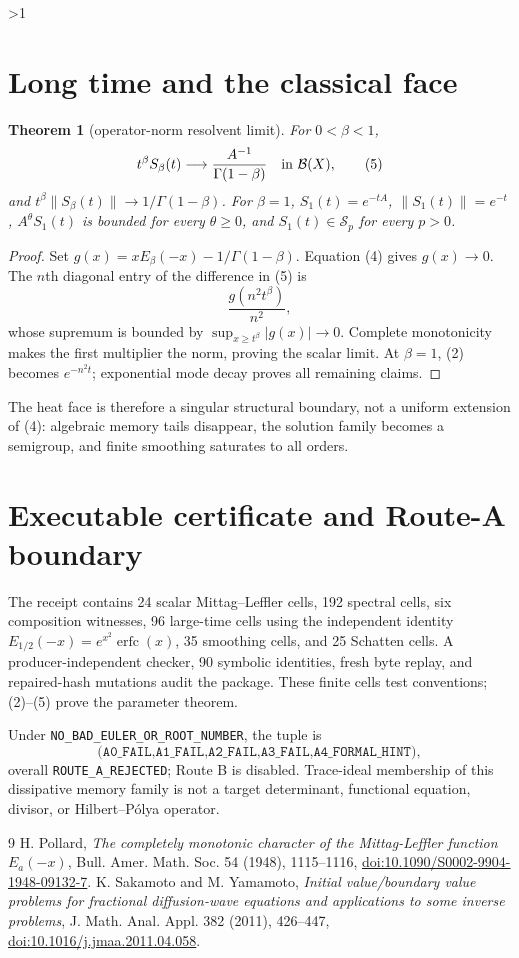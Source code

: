 \documentclass[10pt]{article}
\providecommand{\CRevisionRound}{2}
\newtheorem{theorem}{Theorem}
\begin{document}
\ifnum\CRevisionRound>1
\section{Long time and the classical face}
\begin{theorem}[operator-norm resolvent limit]
For $0<\beta<1$,
\begin{equation}
 t^\beta S_\beta(t)\longrightarrow
 \frac{A^{-1}}{\Gamma(1-\beta)}\quad\hbox{in }\mathcal B(X),          \tag{5}
\end{equation}
and
$t^\beta\lVert S_\beta(t)\rVert\to1/\Gamma(1-\beta)$.
For $\beta=1$, $S_1(t)=e^{-tA}$, $\lVert S_1(t)\rVert=e^{-t}$,
$A^\theta S_1(t)$ is bounded for every $\theta\geq0$, and
$S_1(t)\in\mathcal S_p$ for every $p>0$.
\end{theorem}
\begin{proof}
Set $g(x)=xE_\beta(-x)-1/\Gamma(1-\beta)$.  Equation (4) gives
$g(x)\to0$.  The $n$th diagonal entry of the difference in (5) is
\[
 \frac{g(n^2t^\beta)}{n^2},
\]
whose supremum is bounded by $\sup_{x\geq t^\beta}|g(x)|\to0$.
Complete monotonicity makes the first multiplier the norm, proving the scalar
limit.  At $\beta=1$, (2) becomes $e^{-n^2t}$; exponential mode decay proves
all remaining claims.
\end{proof}

The heat face is therefore a singular structural boundary, not a uniform
extension of (4): algebraic memory tails disappear, the solution family
becomes a semigroup, and finite smoothing saturates to all orders.

\section{Executable certificate and Route-A boundary}
The receipt contains 24 scalar Mittag--Leffler cells, 192 spectral cells, six
composition witnesses, 96 large-time cells using the independent identity
$E_{1/2}(-x)=e^{x^2}\operatorname{erfc}(x)$, 35 smoothing cells, and 25
Schatten cells.  A producer-independent checker, 90 symbolic identities,
fresh byte replay, and repaired-hash mutations audit the package.  These
finite cells test conventions; (2)--(5) prove the parameter theorem.

Under \texttt{NO\_BAD\_EULER\_OR\_ROOT\_NUMBER}, the tuple is
\[
\texttt{(A0\_FAIL,A1\_FAIL,A2\_FAIL,A3\_FAIL,A4\_FORMAL\_HINT)},
\]
overall \texttt{ROUTE\_A\_REJECTED}; Route B is disabled.  Trace-ideal
membership of this dissipative memory family is not a target determinant,
functional equation, divisor, or Hilbert--P\'olya operator.
\fi

\begin{thebibliography}{9}
 H. Pollard,
\emph{The completely monotonic character of the Mittag-Leffler function
$E_a(-x)$}, Bull. Amer. Math. Soc. 54 (1948), 1115--1116,
\href{https://doi.org/10.1090/S0002-9904-1948-09132-7}{doi:10.1090/S0002-9904-1948-09132-7}.
 K. Sakamoto and M. Yamamoto,
\emph{Initial value/boundary value problems for fractional diffusion-wave
equations and applications to some inverse problems}, J. Math. Anal. Appl.
382 (2011), 426--447,
\href{https://doi.org/10.1016/j.jmaa.2011.04.058}{doi:10.1016/j.jmaa.2011.04.058}.
\end{thebibliography}
\end{document}
